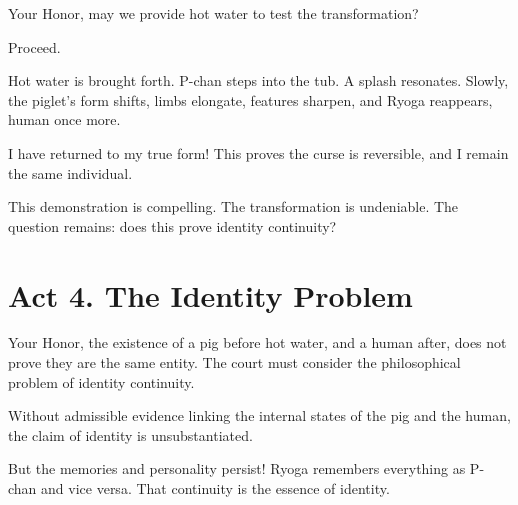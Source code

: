 \documentclass[12pt]{article}
\begin{document}
\begin{tcolorbox}[title=Plaintiff Counsel:]
Your Honor, may we provide hot water to test the transformation?
\end{tcolorbox}

\begin{tcolorbox}[title=Judge:]
Proceed.
\end{tcolorbox}

\begin{tcolorbox}[nobeforeafter,sharp corners=south, colframe=black!50!white, colback=white, fontupper=\itshape, center title, title=Stage Direction:]
Hot water is brought forth. P-chan steps into the tub. A splash resonates. Slowly, the piglet’s form shifts, limbs elongate, features sharpen, and Ryoga reappears, human once more.
\end{tcolorbox}

\begin{tcolorbox}[title={Ryoga (standing, triumphant):}]
I have returned to my true form! This proves the curse is reversible, and I remain the same individual.
\end{tcolorbox}

\begin{tcolorbox}[title=Judge:]
This demonstration is compelling. The transformation is undeniable. The question remains: does this prove identity continuity?
\end{tcolorbox}

\section*{Act 4. The Identity Problem}

\begin{tcolorbox}[title=Defense Counsel:]
Your Honor, the existence of a pig before hot water, and a human after, does not prove they are the same entity. The court must consider the philosophical problem of identity continuity.
\end{tcolorbox}

\begin{tcolorbox}[title={Defense Counsel (continued):}]
Without admissible evidence linking the internal states of the pig and the human, the claim of identity is unsubstantiated.
\end{tcolorbox}

\begin{tcolorbox}[title=Plaintiff Counsel:]
But the memories and personality persist! Ryoga remembers everything as P-chan and vice versa. That continuity is the essence of identity.
\end{tcolorbox}
\end{document}
